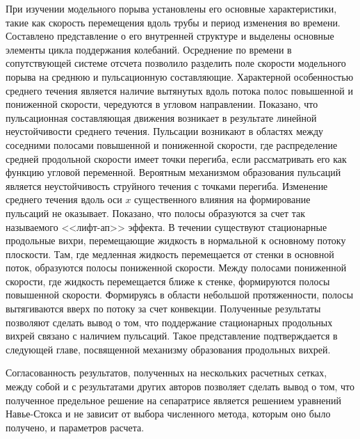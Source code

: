 При изучении модельного порыва установлены его основные характеристики, такие как скорость перемещения вдоль трубы и период изменения во времени. Составлено представление о его внутренней структуре и выделены основные элементы цикла поддержания колебаний. Осреднение по времени в сопутствующей системе отсчета позволило разделить поле скорости модельного порыва на среднюю и пульсационную составляющие. Характерной особенностью среднего течения является наличие вытянутых вдоль потока полос повышенной и пониженной скорости, чередуются в угловом направлении. Показано, что пульсационная составляющая движения возникает в результате линейной неустойчивости среднего течения. Пульсации возникают в областях между соседними полосами повышенной и пониженной скорости, где распределение средней продольной скорости имеет точки перегиба, если рассматривать его как функцию угловой переменной. Вероятным механизмом образования пульсаций является неустойчивость струйного течения с точками перегиба. Изменение среднего течения вдоль оси $x$ существенного влияния на формирование пульсаций не оказывает. Показано, что полосы образуются за счет так называемого <<лифт-ап>> эффекта. В течении существуют стационарные продольные вихри, перемещающие жидкость в нормальной к основному потоку плоскости. Там, где медленная жидкость перемещается от стенки в основной поток, образуются полосы пониженной скорости. Между полосами пониженной скорости, где жидкость перемещается ближе к стенке, формируются полосы повышенной скорости. Формируясь в области небольшой протяженности, полосы вытягиваются вверх по потоку за счет конвекции. Полученные результаты позволяют сделать вывод о том, что поддержание стационарных продольных вихрей связано с наличием пульсаций. Такое представление подтверждается в следующей главе, посвященной механизму образования продольных вихрей.

Согласованность результатов, полученных на нескольких расчетных сетках, между собой и с результатами других авторов позволяет сделать вывод о том, что полученное предельное решение на сепаратрисе является решением уравнений Навье-Стокса и не зависит от выбора численного метода, которым оно было получено, и параметров расчета.

 



